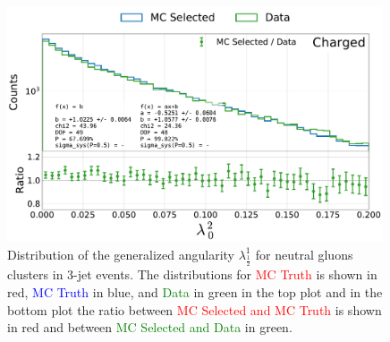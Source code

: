 \begin{figure}[h!]
  \centerfloat
  \includegraphics[width=0.99\textwidth, trim=0 0 0 0, clip, page=7]{figures/quarks/generalized_angularities_cha-down_sample=1.00-ML_vars=vertex-selection=b-ejet_min=4-n_iter_RS_lgb=99-n_iter_RS_xgb=9-cdot_cut=0.90-version=19.pdf}
  \caption[Generalized Angularities for Neutral Gluons Jets: $\lambda_{\frac{1}{2}}^1$]
          {Distribution of the generalized angularity $\lambda_{\frac{1}{2}}^1$ for neutral gluons clusters in 3-jet events. The distributions for \textcolor{red}{MC Truth} is shown in red, \textcolor{blue}{MC Truth} in blue, and \textcolor{green}{Data} in green in the top plot and in the bottom plot the ratio between \textcolor{red}{MC Selected and MC Truth} is shown in red and between \textcolor{green}{MC Selected and Data} in green. }
  \label{fig:q:generalized_angularities_neu_lambda_5_1}
\end{figure}
